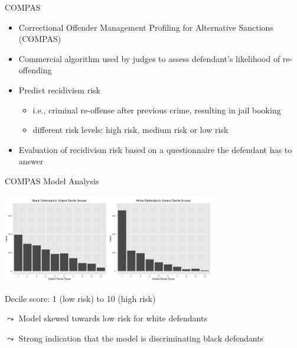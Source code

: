 \documentclass[11pt,compress,t,notes=noshow, aspectratio=169, xcolor=table]{beamer}
\begin{document}





\begin{frame}{COMPAS}

    \begin{itemize}
        \item Correctional Offender Management Profiling for Alternative Sanctions (COMPAS)
        \item Commercial algorithm used by judges to assess defendant’s likelihood of re-offending
        \pause
        \item Predict recidivism risk
        \begin{itemize}
            \item i.e., criminal re-offense after previous crime, resulting in jail booking
            \item different risk levels: high risk, medium risk or low risk
        \end{itemize}
        \pause
        \item Evaluation of recidivism risk based on a questionnaire the defendant has to answer
    \end{itemize}

\end{frame}

\begin{frame}{COMPAS Model Analysis~}

    \centering
    \includegraphics[width=0.7\textwidth]{figure/compass_black_white.PNG}

    Decile score: 1 (low risk) to 10 (high risk)

	$\leadsto$ Model skewed towards low risk for white defendants
	
	$\leadsto$ Strong indication that the model is discriminating black defendants

\end{frame}
\end{document}
